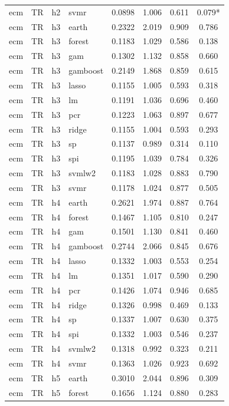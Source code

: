 \begin{ThreePartTable}
\begin{longtable}[t]{llclcccc}
ecm & TR & h2 & svmr & 0.0898 & 1.006 & 0.611 & 0.079*\\
\addlinespace
ecm & TR & h3 & earth & 0.2322 & 2.019 & 0.909 & 0.786\\
ecm & TR & h3 & forest & 0.1183 & 1.029 & 0.586 & 0.138\\
ecm & TR & h3 & gam & 0.1302 & 1.132 & 0.858 & 0.660\\
ecm & TR & h3 & gamboost & 0.2149 & 1.868 & 0.859 & 0.615\\
ecm & TR & h3 & lasso & 0.1155 & 1.005 & 0.593 & 0.318\\
ecm & TR & h3 & lm & 0.1191 & 1.036 & 0.696 & 0.460\\
ecm & TR & h3 & pcr & 0.1223 & 1.063 & 0.897 & 0.677\\
ecm & TR & h3 & ridge & 0.1155 & 1.004 & 0.593 & 0.293\\
ecm & TR & h3 & sp & 0.1137 & 0.989 & 0.314 & 0.110\\
ecm & TR & h3 & spi & 0.1195 & 1.039 & 0.784 & 0.326\\
ecm & TR & h3 & svmlw2 & 0.1183 & 1.028 & 0.883 & 0.790\\
ecm & TR & h3 & svmr & 0.1178 & 1.024 & 0.877 & 0.505\\
\addlinespace
ecm & TR & h4 & earth & 0.2621 & 1.974 & 0.887 & 0.764\\
ecm & TR & h4 & forest & 0.1467 & 1.105 & 0.810 & 0.247\\
ecm & TR & h4 & gam & 0.1501 & 1.130 & 0.841 & 0.460\\
ecm & TR & h4 & gamboost & 0.2744 & 2.066 & 0.845 & 0.676\\
ecm & TR & h4 & lasso & 0.1332 & 1.003 & 0.553 & 0.254\\
ecm & TR & h4 & lm & 0.1351 & 1.017 & 0.590 & 0.290\\
ecm & TR & h4 & pcr & 0.1426 & 1.074 & 0.946 & 0.685\\
ecm & TR & h4 & ridge & 0.1326 & 0.998 & 0.469 & 0.133\\
ecm & TR & h4 & sp & 0.1337 & 1.007 & 0.630 & 0.375\\
ecm & TR & h4 & spi & 0.1332 & 1.003 & 0.546 & 0.237\\
ecm & TR & h4 & svmlw2 & 0.1318 & 0.992 & 0.323 & 0.211\\
ecm & TR & h4 & svmr & 0.1363 & 1.026 & 0.923 & 0.692\\
\addlinespace
ecm & TR & h5 & earth & 0.3010 & 2.044 & 0.896 & 0.309\\
ecm & TR & h5 & forest & 0.1656 & 1.124 & 0.880 & 0.283\\

\end{longtable}
\end{ThreePartTable}
